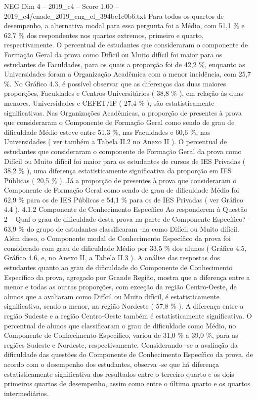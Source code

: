\begin{textsample}{NEG Dim 4 – 2019\_c4 – Score 1.00 – 2019\_c4/enade\_2019\_eng\_el\_394be1c0b6.txt}
Para todos os quartos de desempenho, a alternativa modal para essa pergunta foi a Médio, com 51,1 \% e 62,7 \% dos respondentes nos quartos extremos, primeiro e quarto, respectivamente.
O percentual de estudantes que consideraram o componente de Formação Geral da prova como Difícil ou Muito difícil foi maior para os estudantes de Faculdades, para os quais a proporção foi de 42,2 \%, enquanto as Universidades foram a Organização Acadêmica com a menor incidência, com 25,7 \%.
No Gráfico 4.3, é possível observar que as diferenças das duas maiores proporções, Faculdades e Centros Universitários ( 38,8 \% ), em relação às duas menores, Universidades e CEFET/IF ( 27,4 \% ), são estatisticamente significativas.
Nas Organizações Acadêmicas, a proporção de presentes à prova que consideraram o Componente de Formação Geral como sendo de grau de dificuldade Médio esteve entre 51,3 \%, nas Faculdades e 60,6 \%, nas Universidades ( ver também a Tabela II.2 no Anexo II ).
O percentual de estudantes que consideraram o componente de Formação Geral da prova como Difícil ou Muito difícil foi maior para os estudantes de cursos de IES Privadas ( 38,2 \% ), uma diferença estatisticamente significativa da proporção em IES Públicas ( 20,5 \% ).
Já a proporção de presentes à prova que consideraram o Componente de Formação Geral como sendo de grau de dificuldade Médio foi 62,9 \% para os de IES Públicas e 54,1 \% para os de IES Privadas ( ver Gráfico 4.4 ). 4.1.2 Componente de Conhecimento Específico Ao responderem à Questão 2 – Qual o grau de dificuldade desta prova na parte de Componente Específico? – 63,9 \% do grupo de estudantes classificaram -na como Difícil ou Muito difícil.
Além disso, o Componente modal de Conhecimento Específico da prova foi considerado com grau de dificuldade Médio por 33,5 \% dos alunos ( Gráfico 4.5, Gráfico 4.6, e, no Anexo II, a Tabela II.3 ).
A análise das respostas dos estudantes quanto ao grau de dificuldade do Componente de Conhecimento Específico da prova, agregado por Grande Região, mostra que a diferença entre a menor e todas as outras proporções, com exceção da região Centro-Oeste, de alunos que a avaliaram como Difícil ou Muito difícil, é estatisticamente significativa, sendo a menor, na região Nordeste ( 57,8 \% ).
A diferença entre a região Sudeste e a região Centro-Oeste também é estatisticamente significativa.
O percentual de alunos que classificaram o grau de dificuldade como Médio, no Componente de Conhecimento Específico, variou de 31,0 \% a 39,0 \%, para as regiões Sudeste e Nordeste, respectivamente.
Considerando -se a avaliação da dificuldade das questões do Componente de Conhecimento Específico da prova, de acordo com o desempenho dos estudantes, observa -se que há diferença estatisticamente significativa dos resultados entre o terceiro quarto e os dois primeiros quartos de desempenho, assim como entre o último quarto e os quartos intermediários.

\end{textsample}
